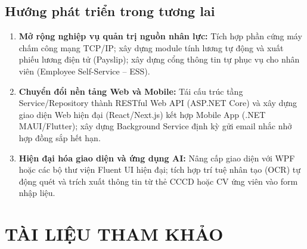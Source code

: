 \documentclass[12pt,a4paper]{report}
\begin{document}
\section{Hướng phát triển trong tương lai}
\begin{enumerate}[leftmargin=1.0cm]
    \item \textbf{Mở rộng nghiệp vụ quản trị nguồn nhân lực:} Tích hợp phần cứng máy chấm công mạng TCP/IP; xây dựng module tính lương tự động và xuất phiếu lương điện tử (Payslip); xây dựng cổng thông tin tự phục vụ cho nhân viên (Employee Self-Service -- ESS).
    \item \textbf{Chuyển đổi nền tảng Web và Mobile:} Tái cấu trúc tầng Service/Repository thành RESTful Web API (ASP.NET Core) và xây dựng giao diện Web hiện đại (React/Next.js) kết hợp Mobile App (.NET MAUI/Flutter); xây dựng Background Service định kỳ gửi email nhắc nhở hợp đồng sắp hết hạn.
    \item \textbf{Hiện đại hóa giao diện và ứng dụng AI:} Nâng cấp giao diện với WPF hoặc các bộ thư viện Fluent UI hiện đại; tích hợp trí tuệ nhân tạo (OCR) tự động quét và trích xuất thông tin từ thẻ CCCD hoặc CV ứng viên vào form nhập liệu.
\end{enumerate}

\chapter*{TÀI LIỆU THAM KHẢO}
\end{document}
